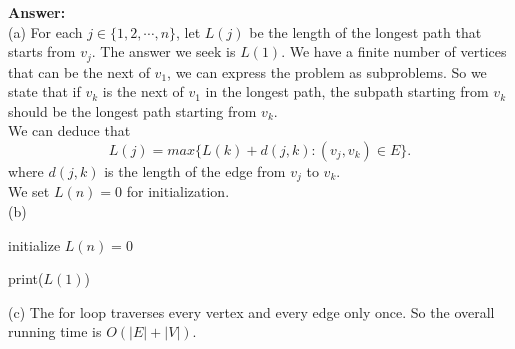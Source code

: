 \documentclass{article}
\begin{document}
\noindent
{\bf Answer:}\\




\noindent(a) For each $j\in\{1,2,\cdots,n\}$, let $L(j)$ be the length of the longest path that starts from $v_j$. 
The answer we seek is $L(1)$. 
We have a finite number of vertices that can be the next of $v_1$, we can express the problem as subproblems. So we state that if $v_k$ is the next of $v_1$ in the longest path, the subpath starting from $v_k$ should be the longest path starting from $v_k$.\\
We can deduce that 
\[ 
L(j)=max{\{L(k)+d(j,k):(v_j,v_k)\in E\}.}
\]
where $d(j,k)$ is the length of the edge from $v_j$ to $v_k$.\\
We set $L(n)=0$ for initialization.\\
\noindent(b) \\
\begin{algorithm}[H]
	initialize $L(n) = 0$ \\
	
	print($L(1)$)
\end{algorithm} 

\noindent(c)
The for loop traverses every vertex and every edge only once. So the overall running time is $O(|E|+|V|)$.
\end{document}
